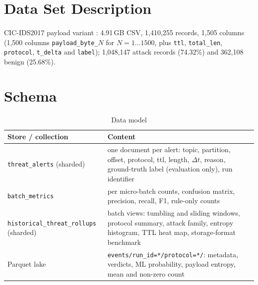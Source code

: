 \section{Data Set Description}
\paragraph{}
CIC-IDS2017 payload variant \cite{cicids}: 4.91\,GB CSV, 1,410,255 records, 1,505 columns (1,500 columns \texttt{payload\_byte\_}$N$ for $N=1\ldots1500$, plus \texttt{ttl}, \texttt{total\_len}, \texttt{protocol}, \texttt{t\_delta} and \texttt{label}); 1,048,147 attack records (74.32\%) and 362,108 benign (25.68\%).

\section{Schema}
\begin{table}[H]
\centering
\begin{tabular}{|p{3.7cm}|p{9.6cm}|}
\hline
\textbf{Store / collection} & \textbf{Content} \\ \hline
\texttt{threat\_alerts} (sharded) & one document per alert: topic, partition, offset, protocol, ttl, length, $\Delta t$, reason, ground-truth label (evaluation only), run identifier \\ \hline
\texttt{batch\_metrics} & per micro-batch counts, confusion matrix, precision, recall, F1, rule-only counts \\ \hline
\texttt{historical\_threat\_rollups} (sharded) & batch views: tumbling and sliding windows, protocol summary, attack family, entropy histogram, TTL heat map, storage-format benchmark \\ \hline
Parquet lake & \texttt{events/run\_id=*/protocol=*/}: metadata, verdicts, ML probability, payload entropy, mean and non-zero count \\ \hline
\end{tabular}
\caption{Data model}
\end{table}
